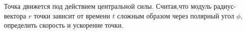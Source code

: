 Точка движется под действием центральной силы. Считая,что модуль радиус-вектора $r$ точки зависит от времени $t$ сложным
образом через полярный угол $\phi$, определить скорость и ускорение точки.
